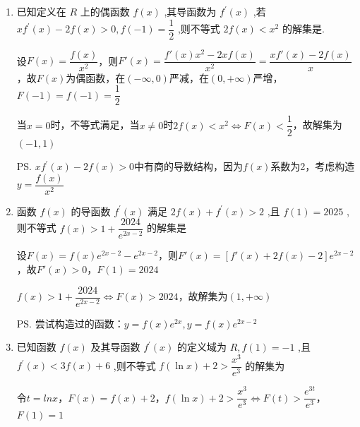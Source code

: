 \begin{enumerate}
\begin{enumerate}
\begin{jieda}
            ${x}^{2}f\left( x\right)  - {4f}\left( 2\right)  < {x}^{2} - 4 \Longleftrightarrow F(x) < F(2)$，故解集为$\left( {-2,0}\right)  \cup  \left( {0,2}\right)$
        \end{jieda}
        
        \item 已知定义在 ${R}$ 上的偶函数 $f\left( x\right)$ ,其导函数为 ${f}^{\prime }\left( x\right)$ ,若 $x{f}^{\prime }\left( x\right)  - {2f}\left( x\right)  > 0,f\left( {-1}\right)  = \dfrac{1}{2}$ ,则不等式 ${2f}\left( x\right)  < {x}^{2}$ 的解集是.
        \begin{jieda}
            设$F(x) = \dfrac{f(x)}{x^2}$，则$F'(x) = \dfrac{f'(x)x^2-2xf(x)}{x^2} = \dfrac{xf'(x)-2f(x)}{x}$，故$F(x)$为偶函数，在$(-\infty, 0)$严减，在$(0, +\infty)$严增，$F(-1) = f(-1) = \dfrac{1}{2}$

            当$x = 0$时，不等式满足，当$x \neq 0$时${2f}\left( x\right)  < {x}^{2} \Longleftrightarrow F(x) < \dfrac{1}{2}$，故解集为$(-1, 1)$

            \ps $x{f}^{\prime }\left( x\right)  - {2f}\left( x\right)  > 0$中有商的导数结构，因为$f(x)$系数为2，考虑构造$y = \dfrac{f(x)}{x^2}$
        \end{jieda}
        
        
        \item 函数 $f\left( x\right)$ 的导函数 ${f}^{\prime }\left( x\right)$ 满足 ${2f}\left( x\right)  + {f}^{\prime }\left( x\right)  > 2$ ,且 $f\left( 1\right)  = {2025}$ ,则不等式 $f\left( x\right)  > 1 + \dfrac{2024}{{{e}}^{{2x} - 2}}$ 的解集是
        \begin{jieda}
            设$F(x) = f(x)e^{2x-2}-e^{2x-2}$，则$F'(x) = [f'(x)+2f(x)-2]e^{2x-2}$，故$F'(x) > 0$，$F(1) = 2024$

            $f\left( x\right)  > 1 + \dfrac{2024}{{{e}}^{{2x} - 2}} \Longleftrightarrow F(x) > 2024$，故解集为$\left( {1, + \infty }\right)$

            \ps 尝试构造过的函数：$y = f(x)e^{2x}, y = f(x)e^{2x-2}$
        \end{jieda}
        \item 已知函数 $f\left( x\right)$ 及其导函数 ${f}^{\prime }\left( x\right)$ 的定义域为 ${R},f\left( 1\right)  =  - 1$ ,且 ${f}^{\prime }\left( x\right)  < {3f}\left( x\right)  + 6$ ,则不等式 $f\left( {\ln x}\right)  + 2 > \dfrac{{x}^{3}}{{{e}}^{3}}$ 的解集为
        \begin{jieda}
            令$t = lnx$，$F(x) = f(x)+2$，$f\left( {\ln x}\right)  + 2 > \dfrac{{x}^{3}}{{{e}}^{3}} \Longleftrightarrow F(t) > \dfrac{e^{3t}}{e^3}$，$F(1) = 1$


\end{jieda}
\end{enumerate}
\end{enumerate}
